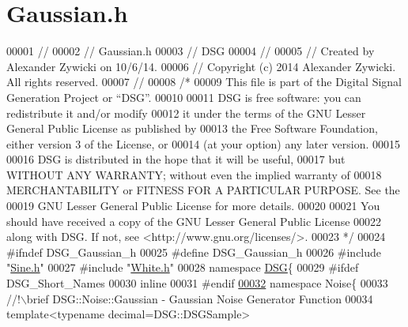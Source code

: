 \hypertarget{_gaussian_8h_source}{\section{Gaussian.\+h}
\label{_gaussian_8h_source}
}

\begin{DoxyCode}
00001 \textcolor{comment}{//}
00002 \textcolor{comment}{//  Gaussian.h}
00003 \textcolor{comment}{//  DSG}
00004 \textcolor{comment}{//}
00005 \textcolor{comment}{//  Created by Alexander Zywicki on 10/6/14.}
00006 \textcolor{comment}{//  Copyright (c) 2014 Alexander Zywicki. All rights reserved.}
00007 \textcolor{comment}{//}
00008 \textcolor{comment}{/*}
00009 \textcolor{comment}{ This file is part of the Digital Signal Generation Project or “DSG”.}
00010 \textcolor{comment}{}
00011 \textcolor{comment}{ DSG is free software: you can redistribute it and/or modify}
00012 \textcolor{comment}{ it under the terms of the GNU Lesser General Public License as published by}
00013 \textcolor{comment}{ the Free Software Foundation, either version 3 of the License, or}
00014 \textcolor{comment}{ (at your option) any later version.}
00015 \textcolor{comment}{}
00016 \textcolor{comment}{ DSG is distributed in the hope that it will be useful,}
00017 \textcolor{comment}{ but WITHOUT ANY WARRANTY; without even the implied warranty of}
00018 \textcolor{comment}{ MERCHANTABILITY or FITNESS FOR A PARTICULAR PURPOSE.  See the}
00019 \textcolor{comment}{ GNU Lesser General Public License for more details.}
00020 \textcolor{comment}{}
00021 \textcolor{comment}{ You should have received a copy of the GNU Lesser General Public License}
00022 \textcolor{comment}{ along with DSG.  If not, see <http://www.gnu.org/licenses/>.}
00023 \textcolor{comment}{ */}
00024 \textcolor{preprocessor}{#ifndef DSG\_Gaussian\_h}
00025 \textcolor{preprocessor}{#define DSG\_Gaussian\_h}
00026 \textcolor{preprocessor}{#include "\hyperlink{_sine_8h}{Sine.h}"}
00027 \textcolor{preprocessor}{#include "\hyperlink{_white_8h}{White.h}"}
00028 \textcolor{keyword}{namespace }\hyperlink{namespace_d_s_g}{DSG}\{
00029 \textcolor{preprocessor}{#ifdef DSG\_Short\_Names}
00030     \textcolor{keyword}{inline}
00031 \textcolor{preprocessor}{#endif}
\hypertarget{_gaussian_8h_source_l00032}{}\hyperlink{namespace_d_s_g_1_1_noise}{00032}     \textcolor{keyword}{namespace }Noise\{\textcolor{comment}{}
00033 \textcolor{comment}{        //!\(\backslash\)brief DSG::Noise::Gaussian - Gaussian Noise Generator Function}
00034 \textcolor{comment}{}        \textcolor{keyword}{template}<\textcolor{keyword}{typename} decimal=DSG::DSGSample>

\end{DoxyCode}

